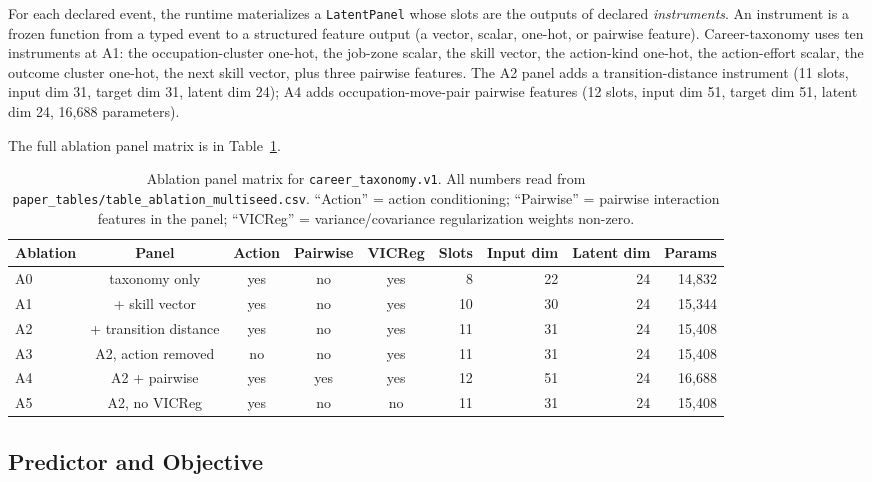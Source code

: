 \documentclass[10pt,twocolumn,letterpaper]{article}
\newcommand{\code}[1]{\texttt{\small #1}}
\begin{document}
For each declared event, the runtime materializes a
\code{LatentPanel} whose slots are the outputs of declared
\emph{instruments}. An instrument is a frozen function from a typed
event to a structured feature output (a vector, scalar, one-hot, or
pairwise feature). Career-taxonomy uses ten instruments at A1: the
occupation-cluster one-hot, the job-zone scalar, the skill vector,
the action-kind one-hot, the action-effort scalar, the outcome
cluster one-hot, the next skill vector, plus three pairwise
features. The A2 panel adds a transition-distance instrument
(11 slots, input dim 31, target dim 31, latent dim 24); A4 adds
occupation-move-pair pairwise features (12 slots, input dim 51,
target dim 51, latent dim 24, 16{,}688 parameters).

The full ablation panel matrix is in Table~\ref{tab:ablation-panels}.

\begin{table}[t]
\caption{Ablation panel matrix for \texttt{career\_taxonomy.v1}.
  All numbers read from
  \texttt{paper\_tables/table\_ablation\_multiseed.csv}. ``Action''
  = action conditioning; ``Pairwise'' = pairwise interaction features
  in the panel; ``VICReg'' = variance/covariance regularization
  weights non-zero.}
\label{tab:ablation-panels}
\centering\small
\begin{tabular}{@{}lccccrrrr@{}}
\toprule
\textbf{Ablation} & \textbf{Panel} & \textbf{Action} & \textbf{Pairwise} & \textbf{VICReg} & \textbf{Slots} & \textbf{Input dim} & \textbf{Latent dim} & \textbf{Params} \\
\midrule
A0 & taxonomy only            & yes & no  & yes & 8  & 22 & 24 & 14{,}832 \\
A1 & + skill vector           & yes & no  & yes & 10 & 30 & 24 & 15{,}344 \\
A2 & + transition distance    & yes & no  & yes & 11 & 31 & 24 & 15{,}408 \\
A3 & A2, action removed       & no  & no  & yes & 11 & 31 & 24 & 15{,}408 \\
A4 & A2 + pairwise            & yes & yes & yes & 12 & 51 & 24 & 16{,}688 \\
A5 & A2, no VICReg            & yes & no  & no  & 11 & 31 & 24 & 15{,}408 \\
\bottomrule
\end{tabular}
\end{table}

\subsection{Predictor and Objective}
\end{document}
